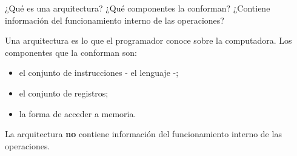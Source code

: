 \begin{enunciado}{\ejercicio}
    ¿Qué es una arquitectura? ¿Qué componentes la conforman? ¿Contiene información del funcionamiento interno de las operaciones?
    \end{enunciado}
    
Una arquitectura es lo que el programador conoce sobre la computadora. Los componentes que la conforman son:
\begin{itemize}
    \item el conjunto de instrucciones - el lenguaje -;
    \item el conjunto de registros;
    \item la forma de acceder a memoria.
\end {itemize}

La arquitectura \textbf{no} contiene información del funcionamiento interno de las operaciones.